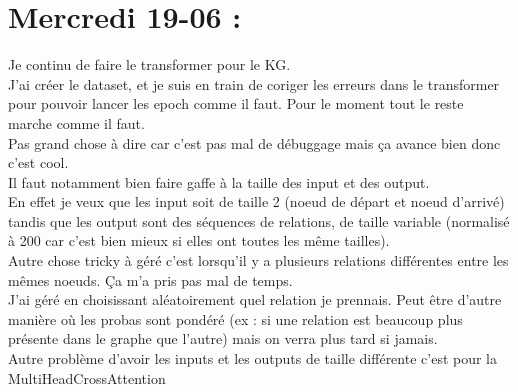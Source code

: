 \documentclass{article}
\begin{document}
\section*{Mercredi 19-06 :}
Je continu de faire le transformer pour le KG.\\
J'ai créer le dataset, et je suis en train de coriger les erreurs dans le transformer pour pouvoir lancer les epoch comme il faut. Pour le moment tout le reste marche comme il faut.\\
Pas grand chose à dire car c'est pas mal de débuggage mais ça avance bien donc c'est cool.\\
Il faut notamment bien faire gaffe à la taille des input et des output.\\
En effet je veux que les input soit de taille 2 (noeud de départ et noeud d'arrivé) tandis que les output sont des séquences de relations, de taille variable (normalisé à 200 car c'est bien mieux si elles ont toutes les même tailles).\\
Autre chose tricky à géré c'est lorsqu'il y a plusieurs relations différentes entre les mêmes noeuds. Ça m'a pris pas mal de temps.\\
J'ai géré en choisissant aléatoirement quel relation je prennais. Peut être d'autre manière où les probas sont pondéré (ex : si une relation est beaucoup plus présente dans le graphe que l'autre) mais on verra plus tard si jamais.\\
Autre problème d'avoir les inputs et les outputs de taille différente c'est pour la MultiHeadCrossAttention
\end{document}
